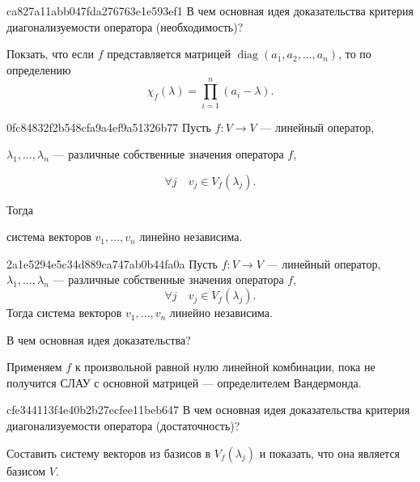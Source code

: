 \begin{note}{ca827a11abb047fda276763e1e593ef1}
    В чем основная идея доказательства критерия диагонализуемости оператора (необходимость)?

    \begin{cloze}{1}
        Покзать, что если \( f \) представляется матрицей \( \operatorname{diag} (a_1, a_2, \ldots, a_n) \), то по определению
        \[
            \chi_f (\lambda) = \prod_{i = 1}^{n} (a_i - \lambda).
        \]
    \end{cloze}
\end{note}

\begin{note}{0fc84832f2b548cfa9a4ef9a51326b77}
    Пусть \( f : V \to V \) --- линейный оператор, \begin{icloze}{3}\( \lambda_1, \ldots, \lambda_n \) --- различные собственные значения оператора \( f \),\end{icloze} \begin{icloze}{2}
        \[
            \forall j \quad v_j \in V_f (\lambda_j).
        \]
    \end{icloze}
    Тогда \begin{icloze}{1}система векторов \( v_1, \ldots, v_n \) линейно независима.\end{icloze}
\end{note}

\begin{note}{2a1e5294e5c34d889ca747ab0b44fa0a}
    Пусть \( f : V \to V \) --- линейный оператор, \( \lambda_1, \ldots, \lambda_n \) --- различные собственные значения оператора \( f \),
    \[
        \forall j \quad v_j \in V_f (\lambda_j).
    \]
    Тогда система векторов \( v_1, \ldots, v_n \) линейно независима.

    В чем основная идея доказательства?

    \begin{cloze}{1}
         Применяем \( f \) к произвольной равной нулю линейной комбинации, пока не получится СЛАУ с основной матрицей --- определителем Вандермонда.
    \end{cloze}
\end{note}

\begin{note}{cfe344113f4e40b2b27ecfee11beb647}
    В чем основная идея доказательства критерия диагонализуемости оператора (достаточность)?

    \begin{cloze}{1}
        Составить систему векторов из базисов в \( V_f (\lambda_j) \) и показать, что она является базисом \( V \).
    \end{cloze}
\end{note}

